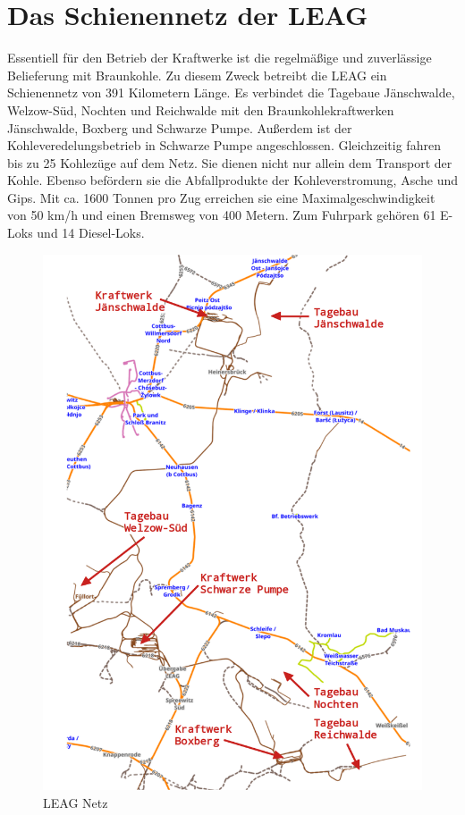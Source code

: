 \section{Das Schienennetz der LEAG}
Essentiell für den Betrieb der Kraftwerke ist die regelmäßige und zuverlässige Belieferung mit Braunkohle. Zu diesem Zweck betreibt die LEAG  ein Schienennetz von 391 Kilometern Länge. Es verbindet die Tagebaue Jänschwalde, Welzow-Süd, Nochten und Reichwalde mit den Braunkohlekraftwerken Jänschwalde, Boxberg und Schwarze Pumpe. Außerdem ist der Kohleveredelungsbetrieb in Schwarze Pumpe angeschlossen. Gleichzeitig fahren bis zu 25 Kohlezüge auf dem Netz. Sie dienen nicht nur allein dem Transport der Kohle. Ebenso befördern sie die Abfallprodukte der Kohleverstromung, Asche und Gips. Mit ca. 1600 Tonnen pro Zug erreichen sie eine Maximalgeschwindigkeit von 50 km/h und einen Bremsweg von 400 Metern. Zum Fuhrpark gehören 61 E-Loks und 14 Diesel-Loks.

\begin{figure}[H]
	\centering
	\includegraphics[width=0.75\linewidth]{images/LEAG-Netz-annotated.png}
	\caption{LEAG Netz}
	\label{fig:leag-netz}
\end{figure}